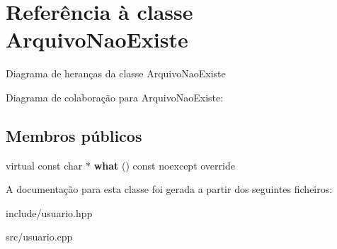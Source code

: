 \hypertarget{classArquivoNaoExiste}{}\section{Referência à classe Arquivo\+Nao\+Existe}
\label{classArquivoNaoExiste}


Diagrama de heranças da classe Arquivo\+Nao\+Existe


Diagrama de colaboração para Arquivo\+Nao\+Existe\+:
\subsection*{Membros públicos}
\begin{DoxyCompactItemize}
\item 
\mbox{\label{classArquivoNaoExiste_afd61f51517233bee5b70ec4848797e4c}} 
virtual const char $\ast$ {\bfseries what} () const noexcept override
\end{DoxyCompactItemize}


A documentação para esta classe foi gerada a partir dos seguintes ficheiros\+:\begin{DoxyCompactItemize}
\item 
include/usuario.\+hpp\item 
src/usuario.\+cpp\end{DoxyCompactItemize}
